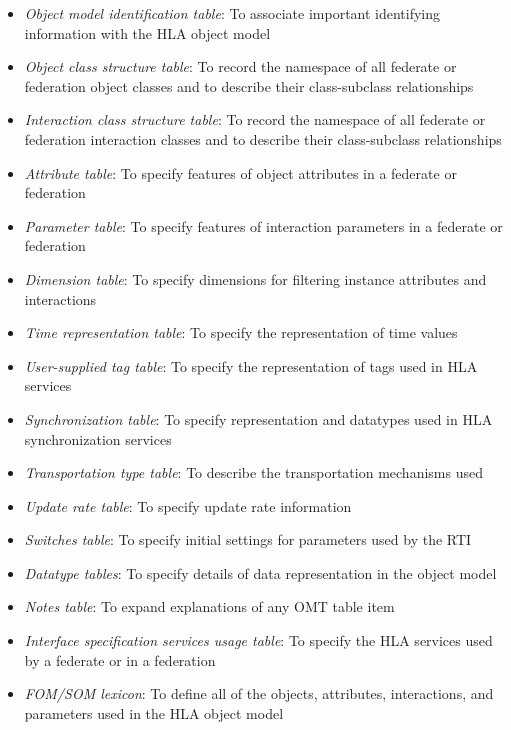 \newpage
\begin{itemize}[leftmargin=32pt,labelwidth=10pt,labelsep=12pt,itemsep=6pt,topsep=0pt]
\item \textit{Object model identification table}: To associate important identifying information with the HLA object model
\item \textit{Object class structure table}: To record the namespace of all federate or federation object classes and to describe their class-subclass relationships
\item \textit{Interaction class structure table}: To record the namespace of all federate or federation interaction classes and to describe their class-subclass relationships
\item \textit{Attribute table}: To specify features of object attributes in a federate or federation
\item \textit{Parameter table}: To specify features of interaction parameters in a federate or federation
\item \textit{Dimension table}: To specify dimensions for filtering instance attributes and interactions
\item \textit{Time representation table}: To specify the representation of time values
\item \textit{User-supplied tag table}: To specify the representation of tags used in HLA services
\item \textit{Synchronization table}: To specify representation and datatypes used in HLA synchronization services
\item \textit{Transportation type table}: To describe the transportation mechanisms used
\item \textit{Update rate table}: To specify update rate information
\item \textit{Switches table}: To specify initial settings for parameters used by the RTI
\item \textit{Datatype tables}: To specify details of data representation in the object model
\item \textit{Notes table}: To expand explanations of any OMT table item
\item \textit{Interface specification services usage table}: To specify the HLA services used by a federate or in a federation
\item \textit{FOM/SOM lexicon}: To define all of the objects, attributes, interactions, and parameters used in the HLA object model
\end{itemize}

